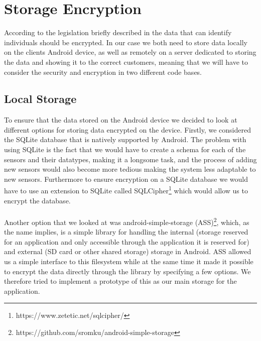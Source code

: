 
\section{Storage Encryption}
\label{sec:storage_encryption}
According to the legislation briefly described in  the data that can identify individuals should be encrypted. In our case we both need to store data locally on the clients Android device, as well as remotely on a server dedicated to storing the data and showing it to the correct customers, meaning that we will have to consider the security and encryption in two different code bases. 

\subsection{Local Storage}
\label{sub:local_storage}
To ensure that the data stored on the Android device we decided to look at different options for storing data encrypted on the device. Firstly, we considered the SQLite database that is natively supported by Android. The problem with using SQLite is the fact that we would have to create a schema for each of the sensors and their datatypes, making it a longsome task, and the process of adding new sensors would also become more tedious making the system less adaptable to new sensors. Furthermore to ensure encryption on a SQLite database we would have to use an extension to SQLite called SQLCipher\footnote{https://www.zetetic.net/sqlcipher/} which would allow us to encrypt the database. 
\\\\
Another option that we looked at was android-simple-storage (ASS)\footnote{https://github.com/sromku/android-simple-storage}, which, as the name implies, is a simple library for handling the internal (storage reserved for an application and only accessible through the application it is reserved for) and external (SD card or other shared storage) storage in Android. ASS allowed us a simple interface to this filesystem while at the same time it made it possible to encrypt the data directly through the library by specifying a few options. We therefore tried to implement a prototype of this as our main storage for the application. 


